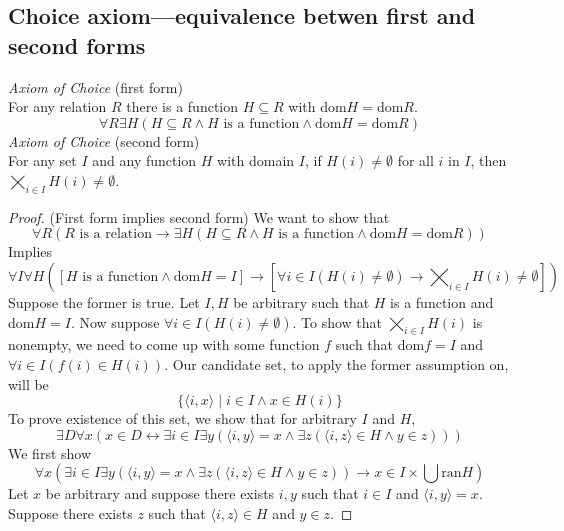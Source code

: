 \documentclass{report}
\begin{document}
\subsection{Choice axiom---equivalence betwen first and second forms}
\textit{Axiom of Choice} (first form)\\
For any relation $R$ there is a function $H\subseteq R$ with dom$H=\text{dom}R$.\
\begin{equation*}
\forall R\exists H(H\subseteq R\land\text{$H$ is a function}\land\text{dom}H=\text{dom}R)
\end{equation*}
\textit{Axiom of Choice} (second form)\\
For any set $I$ and any function $H$ with domain $I$, if $H(i)\neq\emptyset$ for all $i$ in $I$, then $\bigtimes_{i\in I}H(i)\neq\emptyset$.
\begin{proof} (First form implies second form)
We want to show that 
\begin{equation*}
\forall R(R\text{ is a relation}\to\exists H(H\subseteq R\land\text{$H$ is a function}\land\text{dom}H=\text{dom}R))
\end{equation*}
Implies
\begin{equation*}
\forall I\forall H([H\text{ is a function}\land\text{dom}H=I]\to[\forall i\in I(H(i)\neq\emptyset)\to \bigtimes_{i\in I}H(i)\neq\emptyset])
\end{equation*}
Suppose the former is true. Let $I, H$ be arbitrary such that $H$ is a function and dom$H=I$. Now suppose $\forall i\in I(H(i)\neq\emptyset)$. To show that $\bigtimes_{i\in I}H(i)$ is nonempty,
we need to come up with some function $f$ such that dom$f=I$ and 
$\forall i\in I(f(i)\in H(i))$. Our candidate set, to apply the former assumption on, will be
\begin{equation*}
\{\langle i,x\rangle\mid i\in I\land x\in H(i)\}
\end{equation*}
To prove existence of this set, we show that for arbitrary $I$ and $H$, 
\begin{equation*}
\exists D\forall x(x\in D\leftrightarrow\exists i\in I\exists y(\langle i,y\rangle=x\land\exists z(\langle i,z\rangle\in H\land y\in z)))
\end{equation*}
We first show
\begin{equation*}
\forall x(\exists i\in I\exists y(\langle i,y\rangle=x\land\exists z(\langle i,z\rangle\in H\land y\in z))\to x\in I\times\bigcup\text{ran}H)
\end{equation*}
Let $x$ be arbitrary and suppose there exists $i,y$ such that $i\in I$ and $\langle i,y\rangle=x$. Suppose there exists $z$ such that $\langle i,z\rangle\in H$ and $y\in z$.

\end{proof}
\end{document}
